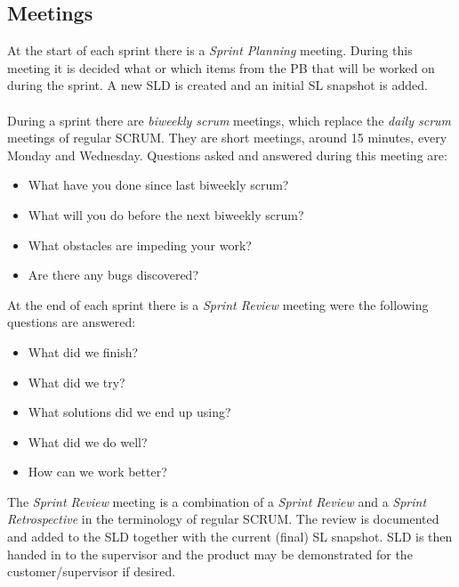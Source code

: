 \subsection{Meetings}
At the start of each sprint there is a \emph{Sprint Planning} meeting. During this meeting it is decided what or which items from the PB that will be worked on during the sprint. A new SLD is created and an initial SL snapshot is added.\\
\\
During a sprint there are \emph{biweekly scrum} meetings, which replace the \emph{daily scrum} meetings of regular SCRUM. They are short meetings, around 15 minutes, every Monday and Wednesday. Questions asked and answered during this meeting are:
\begin{itemize}
  \item What have you done since last biweekly scrum?
  \item What will you do before the next biweekly scrum?
  \item What obstacles are impeding your work?
  \item Are there any bugs discovered?
\end{itemize}
\vspace{4mm}
At the end of each sprint there is a \emph{Sprint Review} meeting were the following questions are answered:
\begin{itemize}
  \item What did we finish? 
  \item What did we try?
  \item What solutions did we end up using?
  \item What did we do well?
  \item How can we work better?
\end{itemize}
The \emph{Sprint Review} meeting is a combination of a \emph{Sprint Review} and a \emph{Sprint Retrospective} in the terminology of regular SCRUM. The review is documented and added to the SLD together with the current (final) SL snapshot. SLD is then handed in to the supervisor and the product may be demonstrated for the customer/supervisor if desired.
